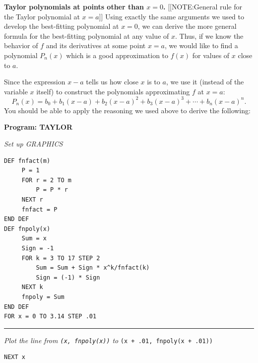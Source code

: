 {\bf Taylor polynomials at points other than \boldmath $x=0$.}  
[[NOTE:General rule for  the Taylor polynomial  at $x=a$]]
Using exactly the same arguments we used to develop the best-fitting
polynomial at $x=0$, we can derive the more general formula for the
best-fitting polynomial at any value of $x$.  Thus, if we know the
behavior of $f$ and its derivatives at some point $x=a$, we would like
to find a polynomial $P_n(x)$ which is a good approximation to $f(x)$
for values of $x$ close to $a$.

Since the expression $x-a$ tells us how close $x$ is to $a$, we use it
(instead of the variable $x$ itself) to construct the polynomials
approximating $f$ at $x=a$:
\[
P_n(x)=b_0+b_1(x-a)+b_2(x-a)^2+b_3(x-a)^3+\cdots+b_n(x-a)^n.
\]
You should be able to apply the reasoning we used above to derive the
following:
\begin{center}
\end{center}



\begin{center}

{\bf Program: TAYLOR }
\end{center}

{\sl Set up GRAPHICS}

\begin{verbatim}
DEF fnfact(m)
     P = 1
     FOR r = 2 TO m
         P = P * r
     NEXT r
     fnfact = P
END DEF
DEF fnpoly(x)
     Sum = x
     Sign = -1
     FOR k = 3 TO 17 STEP 2
         Sum = Sum + Sign * x^k/fnfact(k)
         Sign = (-1) * Sign
     NEXT k
     fnpoly = Sum
END DEF
FOR x = 0 TO 3.14 STEP .01
\end{verbatim}

\rule{24pt}{0pt} {\sl Plot the line from 
                {\tt (x, fnpoly(x))}} {\sl to} 
                {\tt (x + .01, fnpoly(x + .01))}\\

\begin{verbatim}
NEXT x
\end{verbatim}


